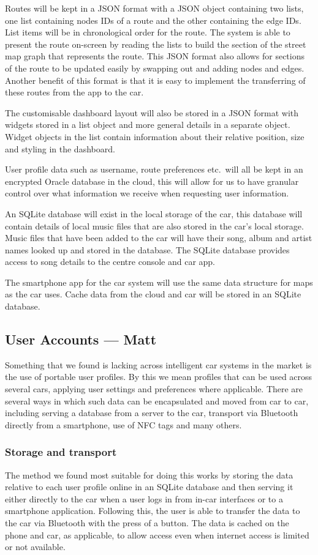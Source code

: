 \documentclass{article}
\begin{document}
Routes will be kept in a JSON format with a JSON object containing two lists, one list containing nodes IDs of a route and the other containing the edge IDs. List items will be in chronological order for the route. The system is able to present the route on-screen by reading the lists to build the section of the street map graph that represents the route. This JSON format also allows for sections of the route to be updated easily by swapping out and adding nodes and edges. Another benefit of this format is that it is easy to implement the transferring of these routes from the app to the car.

The customisable dashboard layout will also be stored in a JSON format with widgets stored in a list object and more general details in a separate object. Widget objects in the list contain information about their relative position, size and styling in the dashboard.

User profile data such as username, route preferences etc.\ will all be kept in an encrypted Oracle database in the cloud, this will allow for us to have granular control over what information we receive when requesting user information.

An SQLite database will exist in the local storage of the car, this database will contain details of local music files that are also stored in the car's local storage. Music files that have been added to the car will have their song, album and artist names looked up and stored in the database. The SQLite database provides access to song details to the centre console and car app.

The smartphone app for the car system will use the same data structure for maps as the car uses. Cache data from the cloud and car will be stored in an SQLite database.

\subsection{User Accounts --- Matt}\label{ssec:user-accounts}
Something that we found is lacking across intelligent car systems in the market is the use of portable user profiles. By this we mean profiles that can be used across several cars, applying user settings and preferences where applicable.
There are several ways in which such data can be encapsulated and moved from car to car, including serving a database from a server to the car, transport via Bluetooth directly from a smartphone, use of NFC tags and many others.
\subsubsection{Storage and transport}
The method we found most suitable for doing this works by storing the data relative to each user profile online in an SQLite database and then serving it either directly to the car when a user logs in from in-car interfaces or to a smartphone application. Following this, the user is able to transfer the data to the car via Bluetooth with the press of a button. The data is cached on the phone and car, as applicable, to allow access even when internet access is limited or not available.
\end{document}
